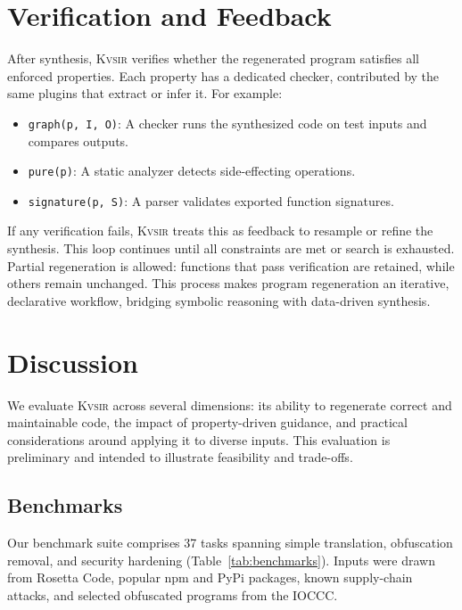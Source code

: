 \documentclass[sigplan,review,anonymous,10pt]{acmart}
\newcommand{\sys}{{\scshape Kv{\textalpha}sir}\xspace}
\begin{document}
\section{Verification and Feedback}
\label{sec:verification}

After synthesis, \sys verifies whether the regenerated program satisfies all
enforced properties. Each property has a dedicated checker, contributed by the
same plugins that extract or infer it. For example:

\begin{itemize}
  \item \texttt{graph(p, I, O)}: A checker runs the synthesized code on test inputs and compares outputs.
  \item \texttt{pure(p)}: A static analyzer detects side-effecting operations.
  \item \texttt{signature(p, S)}: A parser validates exported function signatures.
\end{itemize}

If any verification fails, \sys treats this as feedback to resample or refine
the synthesis. This loop continues until all constraints are met or search is
exhausted. Partial regeneration is allowed: functions that pass verification
are retained, while others remain unchanged.
This process makes program regeneration an iterative, declarative workflow,
bridging symbolic reasoning with data-driven synthesis.

\section{Discussion}
\label{sec:evaluation}

We evaluate \sys across several dimensions: its ability to regenerate correct and maintainable code, the impact of property-driven guidance, and practical considerations around applying it to diverse inputs. This evaluation is preliminary and intended to illustrate feasibility and trade-offs.

\subsection{Benchmarks}

Our benchmark suite comprises 37 tasks spanning simple translation, obfuscation removal, and security hardening (Table~\ref{tab:benchmarks}). Inputs were drawn from Rosetta Code, popular npm and PyPi packages, known supply-chain attacks, and selected obfuscated programs from the IOCCC.
\end{document}
